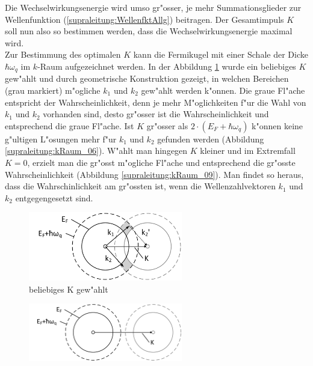 \begin{refsection}
Die Wechselwirkungsenergie wird umso gr"osser, je mehr Summationsglieder zur Wellenfunktion (\ref{supraleitung:WellenfktAllg}) beitragen. Der Gesamtimpuls $K$ soll nun also so bestimmen werden, dass die Wechselwirkungsenergie maximal wird.
\\
Zur Bestimmung des optimalen $K$ kann die Fermikugel mit einer Schale der Dicke $\hbar\omega_q$ im $k$-Raum aufgezeichnet werden. In der Abbildung \ref{supraleitung:kRaum_05} wurde ein beliebiges $K$ gew"ahlt und durch geometrische Konstruktion gezeigt, in welchen Bereichen (grau markiert) m"ogliche $k_1$ und $k_2$ gew"ahlt werden k"onnen. Die graue Fl"ache entspricht der Wahrscheinlichkeit, denn je mehr M"oglichkeiten f"ur die Wahl von $k_1$ und $k_2$ vorhanden sind, desto gr"osser ist die Wahrscheinlichkeit und entsprechend die graue Fl"ache. Ist $K$ gr"osser als $2\cdot(E_F+\hbar\omega_q)$ k"onnen keine g"ultigen L"osungen mehr f"ur $k_1$ und $k_2$ gefunden werden (Abbildung \ref{supraleitung:kRaum_06}). W"ahlt man hingegen $K$ kleiner und im Extremfall $K=0$, erzielt man die gr"osst m"ogliche Fl"ache und entsprechend die gr"osste Wahrscheinlichkeit (Abbildung \ref{supraleitung:kRaum_09}). Man findet so heraus, dass die Wahrschinlichkeit am gr"ossten ist, wenn die Wellenzahlvektoren $k_1$ und $k_2$ entgegengesetzt sind.
\begin{figure}	
\centering
\includegraphics[width=0.6\textwidth]{supraleitung/Graphics/kGraphic05g.pdf} %
\caption{beliebiges K gew"ahlt
\label{supraleitung:kRaum_05}}
\end{figure}
\begin{figure}	
\centering
\includegraphics[width=0.6\textwidth]{supraleitung/Graphics/kGraphic06g.pdf} %

\end{figure}
\end{refsection}
